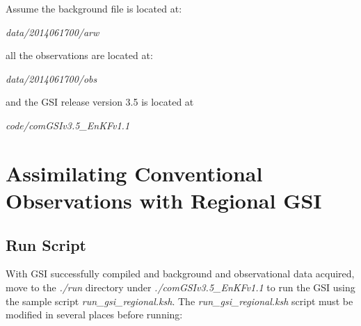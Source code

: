 Assume the background file is located at:

\textit{data/2014061700/arw}

all the observations are located at:

\textit{data/2014061700/obs}

and the GSI release version 3.5 is located at

\textit{code/comGSIv3.5\_EnKFv1.1}

\section{Assimilating Conventional Observations with Regional GSI}

\subsection{Run Script}
\label{sec5.1.1}

With GSI successfully compiled and background and observational data acquired, move to the \textit{./run} directory under \textit{./comGSIv3.5\_EnKFv1.1} to run the GSI using the sample script \textit{run\_gsi\_regional.ksh}.  The \textit{run\_gsi\_regional.ksh} script must be modified in several places before running:

